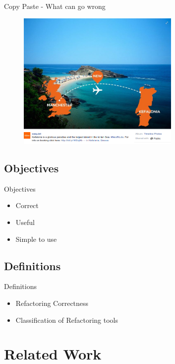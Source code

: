 \documentclass[xcolor=dvipsnames]{beamer}
\begin{document}
\begin{frame}{Copy Paste - What can go wrong}
\begin{figure}[htbp]
  \centering
  \includegraphics[width=0.7\textwidth]{img/WhatCanGoWrongWithCopyPaste.png}
  \label{fig:CopyPaste-error}
\end{figure}
\end{frame}
\subsection{Objectives}

\begin{frame}{Objectives}%
  \begin{itemize}
  \item {
    Correct
  }
  \item {
    Useful
  }
  \item {
    Simple to use
  }
  \end{itemize}
\end{frame}

\subsection{Definitions}
\begin{frame}{Definitions}
\begin{itemize}
\item Refactoring Correctness
\item Classification of Refactoring tools
\end{itemize}
\end{frame}

\section{Related Work}
\end{document}
